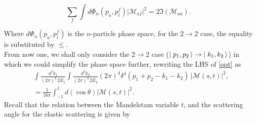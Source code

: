 \begin{equation}
	\sum_{f}  \int d\Phi_n(p_a,p_i^f)| \mathcal M_{af}|^2 = 2 \mathfrak{I}( \mathcal M_{aa}). 
	\label{opt}
\end{equation}

Where $d\Phi_n(p_a,p_i^f)$ is the $n$-particle phase space, for the $2\to2$ case, the equality is substituted by $\leq$. \\ From now one, we shall only consider the $2\to2$ case  ($\mbox{$\mid p_1,p_2\,\rangle$} \to \mbox{$\mid k_1,k_2\,\rangle$}$) in which we could simplify the phase space further, rewriting the LHS of \eqref{opt} as
\begin{align}
	&\int  \frac{d^3k_1}{(2 \pi)^3\,2E_1} \int  \frac{d^3k_2}{(2 \pi)^3\,2E_2} (2 \pi)^4 \delta^4(p_1+p_2-k_1-k_2)\,| \mathcal M (s,t)|^2 ,\nonumber \\
	&= \frac{1}{16 \pi} \int_{-1}^{1} d(\cos \theta) | \mathcal M (s,t)|^2.
\end{align}
Recall that the relation between the Mandelstam variable $t$, and the scattering angle for the elastic scattering is given by

